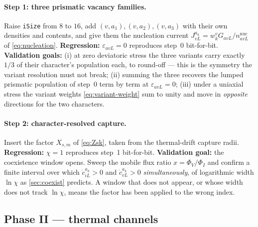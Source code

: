 \documentclass{article}
\begin{document}
\paragraph{Step 1: three prismatic vacancy families.} Raise \texttt{iSize} from
$8$ to $16$, add $(v,a_1),(v,a_2),(v,a_3)$ with their own densities and
contents, and give them the nucleation current
$J^{a_k}_{vL}=w^v_kG_{avL}/n^{\mathrm{nuc}}_{avL}$ of \cref{eq:nucleation}.
\textbf{Regression:} $\varepsilon_{avL}=0$ reproduces step~0 bit-for-bit.
\textbf{Validation goals:} (i) at zero deviatoric stress the three variants carry
exactly $1/3$ of their character's population each, to round-off --- this is the
symmetry the variant resolution must not break; (ii) summing the three recovers
the lumped prismatic population of step~0 term by term at
$\varepsilon_{avL}=0$; (iii) under a uniaxial stress the variant weights
\cref{eq:variant-weight} sum to unity and move in \emph{opposite} directions for
the two characters.

\paragraph{Step 2: character-resolved capture.} Insert the factor $X_{s,m}$ of
\cref{eq:Zsk}, taken from the thermal-drift capture radii.
\textbf{Regression:} $\chi=1$ reproduces step~1 bit-for-bit.
\textbf{Validation goal:} the coexistence window opens. Sweep the mobile flux
ratio $x=\Phi_V/\Phi_I$ and confirm a finite interval over which
$\dot c^{a_k}_{iL}>0$ and $\dot c^{a_k}_{vL}>0$ \emph{simultaneously}, of
logarithmic width $\ln\chi$ as \cref{sec:coexist} predicts. A window that does
not appear, or whose width does not track $\ln\chi$, means the factor has been
applied to the wrong index.

\subsection{Phase II --- thermal channels}
\label{sec:plan-phase2}
\end{document}
